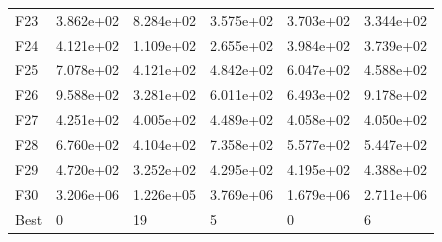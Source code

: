 \begin{tabular}{llllll}
F23  &  3.862e+02 &  8.284e+02 &  3.575e+02 &  3.703e+02 &  3.344e+02 \\
F24  &  4.121e+02 &  1.109e+02 &  2.655e+02 &  3.984e+02 &  3.739e+02 \\
F25  &  7.078e+02 &  4.121e+02 &  4.842e+02 &  6.047e+02 &  4.588e+02 \\
F26  &  9.588e+02 &  3.281e+02 &  6.011e+02 &  6.493e+02 &  9.178e+02 \\
F27  &  4.251e+02 &  4.005e+02 &  4.489e+02 &  4.058e+02 &  4.050e+02 \\
F28  &  6.760e+02 &  4.104e+02 &  7.358e+02 &  5.577e+02 &  5.447e+02 \\
F29  &  4.720e+02 &  3.252e+02 &  4.295e+02 &  4.195e+02 &  4.388e+02 \\
F30  &  3.206e+06 &  1.226e+05 &  3.769e+06 &  1.679e+06 &  2.711e+06 \\
Best &          0 &         19 &          5 &          0 &          6 \\
\bottomrule
\end{tabular}
